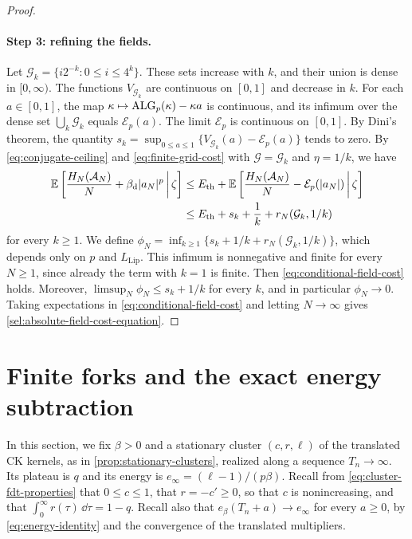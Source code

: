 \begin{proof}
\paragraph{Step 3: refining the fields.}
Let $\mathcal G_k=\{i2^{-k}:0\le i\le4^k\}$. These sets increase with $k$,
and their union is dense in $[0,\infty)$. The functions
$V_{\mathcal G_k}$ are continuous on $[0,1]$ and decrease in $k$. For each
$a\in[0,1]$, the map $\kappa\mapsto\operatorname{ALG}_p(\kappa)-\kappa a$ is continuous,
and its infimum over the dense set $\bigcup_k\mathcal G_k$ equals
$\mathcal E_p(a)$. The limit $\mathcal E_p$ is continuous on $[0,1]$. By
Dini's theorem, the quantity
$s_k=\sup_{0\le a\le1}\{V_{\mathcal G_k}(a)-\mathcal E_p(a)\}$ tends to zero.
By \eqref{eq:conjugate-ceiling} and \eqref{eq:finite-grid-cost} with
$\mathcal G=\mathcal G_k$ and $\eta=1/k$, we have
\[
\begin{aligned}
 \mathbb E\left[\frac{H_N(\mathcal A_N)}N+\beta_{\mathrm d}|a_N|^p\,\middle|\,\zeta\right]
 &\le E_{\mathrm{th}}+\mathbb E\left[\frac{H_N(\mathcal A_N)}N-\mathcal E_p(|a_N|)\,\middle|\,\zeta\right]\\
 &\le E_{\mathrm{th}}+s_k+\frac1k+r_N(\mathcal G_k,1/k)
\end{aligned}
\]
for every $k\ge1$. We define
$\phi_N=\inf_{k\ge1}\{s_k+1/k+r_N(\mathcal G_k,1/k)\}$, which depends only on
$p$ and $L_{\mathrm{Lip}}$. This infimum is nonnegative and finite for every
$N\ge1$, since already the term with $k=1$ is finite. Then
\eqref{eq:conditional-field-cost} holds. Moreover,
$\limsup_N\phi_N\le s_k+1/k$ for every $k$, and in particular $\phi_N\to0$. Taking
expectations in \eqref{eq:conditional-field-cost} and letting $N\to\infty$
gives \eqref{sel:absolute-field-cost-equation}.
\end{proof}

\section{Finite forks and the exact energy subtraction}\label{sec:general-forks}

In this section, we fix $\beta>0$ and a stationary cluster $(c,r,\ell)$ of
the translated CK kernels, as in \cref{prop:stationary-clusters}, realized
along a sequence $T_n\to\infty$. Its plateau is $q$ and its energy is
$e_\infty=(\ell-1)/(p\beta)$. Recall from \eqref{eq:cluster-fdt-properties}
that $0\le c\le1$, that $r=-c'\ge0$, so that $c$ is nonincreasing, and that
$\int_0^\infty r(\tau)\,\dd\tau=1-q$. Recall also that $e_\beta(T_n+a)\to e_\infty$
for every $a\ge0$, by \eqref{eq:energy-identity} and the convergence of
the translated multipliers.

